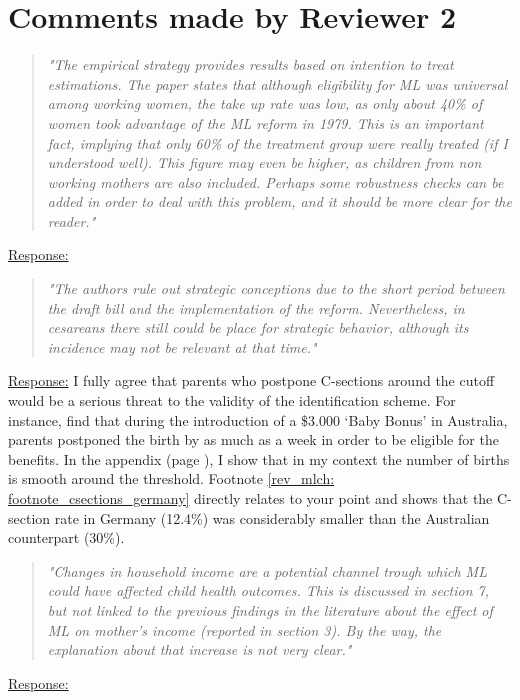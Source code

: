 
\clearpage
\section*{Comments made by Reviewer 2}


% 
\begin{quote}
	\textit{"The empirical strategy provides results based on intention to treat estimations. The paper states that although eligibility for ML was universal among working women, the take up rate was low, as only about 40\% of women took advantage of the ML reform in 1979. This is an important fact, implying that only 60\% of the treatment group were really treated (if I understood well). This figure may even be higher, as children from non working mothers are also included. Perhaps some robustness checks can be added in order to deal with this problem, and it should be more clear for the reader."}
\end{quote}
\underline{Response:}

% 
\begin{quote}
	\textit{"The authors rule out strategic conceptions due to the short period between the draft bill and the implementation of the reform. Nevertheless, in cesareans there still could be place for strategic behavior, although its incidence may not be relevant at that time."}
\end{quote}
\underline{Response:} I fully agree that parents who postpone C-sections around the cutoff would be a serious threat to the validity of the identification scheme. For instance, \cite{gans2009born} find that during the introduction of a \$3.000 `Baby Bonus' in Australia, parents postponed the birth by as much as a week in order to be eligible for the benefits. In the appendix (page \pageref{sec_mlch:empirical_strategy_threats+validity}), I show that in my context the number of births is smooth around the threshold. Footnote \ref{rev_mlch: footnote_csections_germany} directly relates to your point and shows that the C-section rate in Germany (12.4\%) was considerably smaller than the Australian counterpart (30\%).

 


% 
\begin{quote}
	\textit{"Changes in household income are a potential channel trough which ML could have affected child health outcomes. This is discussed in section 7, but not linked to the previous findings in the literature about the effect of ML on mother's income (reported in section 3). By the way, the explanation about that increase is not very clear."}
\end{quote}
\underline{Response:}

